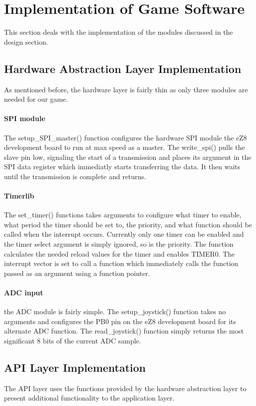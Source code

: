 \section{Implementation of Game Software}

This section deals with the implementation of the modules discussed in the design section.

\subsection{Hardware Abstraction Layer Implementation}
As mentioned before, the hardware layer is fairly thin as only three modules are needed for our game.

\paragraph{SPI module}
The setup\_SPI\_master() function  configures the hardware SPI module the eZ8 development board to run at max speed as a master.
The write\_spi() pulls the slave pin low, signaling the start of a transmission and places its argument in the SPI data register
which immediatly starts transferring the data. It then waits until the transmission is complete and returns.

\paragraph{Timerlib}
The set\_timer() functions takes arguments to configure what timer to enable, what period the timer
should be set to, the priority, and what function should be called when the interrupt occurs. Currently
only one timer can be enabled and the timer select argument is simply ignored, so is the priority. 
The function calculates the needed reload values for the timer and enables TIMER0. The interrupt vector
is set to call a function which immediately calls the function passed as an argument using a function pointer.

\paragraph{ADC input}
the ADC module is fairly simple. The setup\_joystick() function takes
no arguments and configures the PB0 pin on the eZ8 development board for its alternate ADC function.
The read\_joystick() function simply returns the most significant 8 bits of the current ADC sample.

\subsection{API Layer Implementation}
The API layer uses the functions provided by the hardware abstraction layer to present additional functionality to the application
layer.

